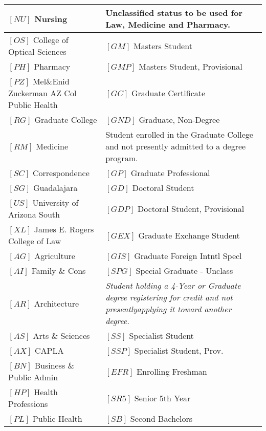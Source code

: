 \documentclass[12pt,notitlepage]{article}
\begin{document}
{\begin{tabular}{|p{7cm}|p{7cm}|}
$\left[ NU \right]$ Nursing & Unclassified status to be used for Law, Medicine and Pharmacy. 				\\
\hline
$\left[ OS \right]$ College of Optical Sciences & $\left[ GM \right]$ Masters Student 				\\
\hline
$\left[ PH \right]$ Pharmacy & $\left[ GMP \right]$ Masters Student, Provisional 				\\
\hline
$\left[ PZ \right]$ Mel\&Enid Zuckerman AZ Col Public Health & $\left[ GC \right]$ Graduate Certificate \\				
\hline
$\left[ RG \right]$ Graduate College & $\left[ GND \right]$ Graduate, Non-Degree 				\\
\hline
$\left[ RM \right]$ Medicine & Student enrolled in the Graduate College and not presently admitted to a degree program. \\				
\hline
$\left[ SC \right]$ Correspondence & $\left[ GP \right]$ Graduate Professional 				\\
\hline
$\left[ SG \right]$ Guadalajara & $\left[ GD \right]$ Doctoral Student 				\\
\hline
$\left[ US \right]$ University of Arizona South & $\left[ GDP \right]$ Doctoral Student, Provisional \\				
\hline
$\left[ XL \right]$ James E. Rogers College of Law & $\left[ GEX \right]$ Graduate Exchange Student 			\\	
\hline
$\left[ AG \right]$ Agriculture & $\left[ GIS \right]$ Graduate Foreign Intntl Specl 				\\
\hline
$\left[ AI \right]$ Family \& Cons & $\left[ SPG \right]$ Special Graduate - Unclass 				\\
\hline
$\left[ AR \right]$ Architecture & \emph{Student holding a 4-Year or Graduate degree registering for credit and not presentlyapplying it toward another degree.} \\
\hline
$\left[ AS \right]$ Arts \& Sciences & $\left[ SS \right]$ Specialist Student 				\\
\hline
$\left[ AX \right]$ CAPLA & $\left[ SSP \right]$ Specialist Student, Prov. 				\\
\hline
$\left[ BN \right]$ Business \& Public Admin & $\left[ EFR \right]$ Enrolling Freshman 	\\			
\hline
$\left[ HP \right]$ Health Professions & $\left[ SR5 \right]$ Senior 5th Year 				\\
\hline
$\left[ PL \right]$ Public Health & $\left[ SB \right]$ Second Bachelors 				\\
\hline

\end{tabular}}
\end{document}
